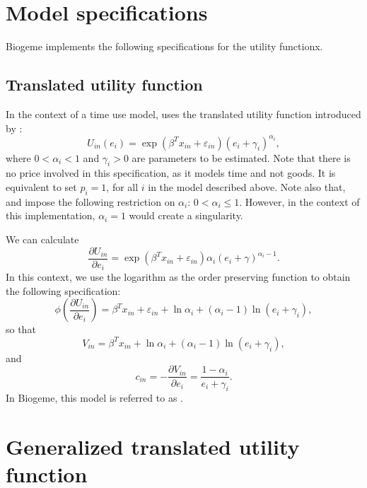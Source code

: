 \documentclass[12pt,a4paper]{article}
\begin{document}
\section{Model specifications}

Biogeme implements the following specifications for the utility functionx.

\subsection{Translated utility function}
In the context of a time use model,  uses the translated utility function introduced by :
\begin{equation}
  \label{eq:orig_u}
U_{in}(e_i) = \exp(\beta^T x_{in} + \varepsilon_{in})(e_i + \gamma_i)^{\alpha_i},
\end{equation}
where $0 < \alpha_i < 1$ and $\gamma_i > 0$ are parameters to be
estimated. Note that there is no price involved in this specification,
as it models time and not goods. It is equivalent to set $p_i=1$, for all $i$ in the model
described above. Note also that,
 and  impose
the following restriction on $\alpha_i$: $0 < \alpha_i \leq
1$. However, in the context of this implementation, $\alpha_i=1$ would
create a singularity.

We can calculate
\begin{equation}
\frac{\partial U_{in}}{\partial e_i} = \exp(\beta^T x_{in} + \varepsilon_{in})\alpha_i(e_i + \gamma)^{\alpha_i-1}.
\end{equation}
In this context, we use the logarithm as the order preserving function to obtain the following specification:
\[
\phi\left(\frac{\partial U_{in}}{\partial e_i}\right) =\beta^T x_{in} + \varepsilon_{in} + \ln \alpha_i + (\alpha_i-1) \ln (e_i + \gamma_i),
\]
so that
\[
V_{in} = \beta^T x_{in} + \ln \alpha_i + (\alpha_i-1) \ln (e_i + \gamma_i),
\]
and
\[
c_{in} = -\frac{\partial V_{in}}{\partial e_i} = \frac{1-\alpha_i}{e_i + \gamma_i}.
\]
In Biogeme, this model is referred to as
\lstinline@translated@.


\section{Generalized translated utility function}
\end{document}
